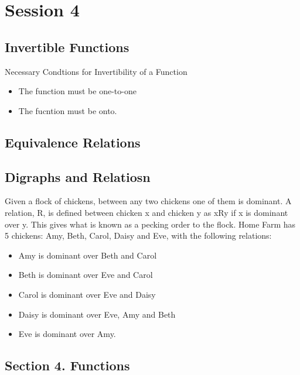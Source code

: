 \documentclass[]{report}
\begin{document}
\chapter{Session 4}
\section*{Invertible Functions}

Necessary Condtions for Invertibility of a Function
\begin{itemize}
\item The function must be one-to-one
\item The fucntion must be onto.
\end{itemize}


\section*{Equivalence Relations}




\section{Digraphs and Relatiosn}
Given a flock of chickens, between any two chickens one of them is
dominant. A relation, R, is defined between chicken x and chicken y as xRy if x is
dominant over y. This gives what is known as a pecking order to the flock. Home
Farm has 5 chickens: Amy, Beth, Carol, Daisy and Eve, with the following relations:

\begin{itemize}
\item Amy is dominant over Beth and Carol
\item Beth is dominant over Eve and Carol
\item Carol is dominant over Eve and Daisy
\item Daisy is dominant over Eve, Amy and Beth
\item Eve is dominant over Amy.
\end{itemize}

\newpage

\section*{Section 4. Functions}
\end{document}
